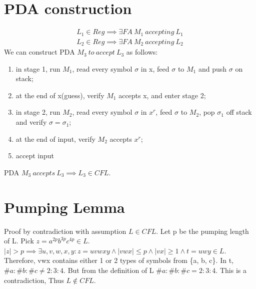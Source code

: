 \documentclass{article}
\begin{document}
\section{PDA construction}
\begin{align*}
L_1 \in Reg \implies \exists FA \ M_1 \ accepting \ L_1\\
L_2 \in Reg \implies \exists FA \ M_2 \ accepting \ L_2
\end{align*}
We can construct PDA $M_3 \ to \ accept \ L_3$ as follows:
\begin{enumerate}
  \item in stage 1, run $M_1$, read every symbol $\sigma$ in x, feed $\sigma$
  to $M_1$ and push $\sigma$ on stack;
  \item at the end of x(guess), verify $M_1$ accepts x, and enter stage 2;
  \item in stage 2, run $M_2$, read every symbol $\sigma$ in $x^r$, feed
  $\sigma$ to $M_2$, pop $\sigma_1$ off stack and verify $\sigma = \sigma_1$;
  \item at the end of input, verify $M_2$ accepts $x^r$;
  \item accept input
\end{enumerate}
PDA $M_3 \ accepts \ L_3 \implies L_3 \in CFL$.

\section{Pumping Lemma}
Proof by contradiction with assumption $L \in CFL$. Let p be the pumping length
of L. Pick $z = a^{2p}b^{3p}c^{4p} \in L$.$ \mid z \mid > p \implies \exists
u, v, w, x, y: z = uvwxy \land \mid vwx \mid \leq p \land \mid vx \mid \geq 1
\land t =uwy \in L$. Therefore, vwx contains either 1 or 2 types of symbols from
\{a, b, c\}. In t, $\#a:\#b:\#c \neq 2:3:4$. But from the definition of L
$\#a:\#b:\#c = 2:3:4$.  This is a contradiction, Thus $L \notin CFL$.
\end{document}
